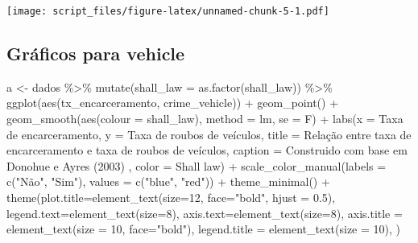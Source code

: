 \documentclass[
]{article}
\newenvironment{Shaded}{\begin{snugshade}}{\end{snugshade}}
\newcommand{\AttributeTok}[1]{\textcolor[rgb]{0.77,0.63,0.00}{#1}}
\newcommand{\DecValTok}[1]{\textcolor[rgb]{0.00,0.00,0.81}{#1}}
\newcommand{\FloatTok}[1]{\textcolor[rgb]{0.00,0.00,0.81}{#1}}
\newcommand{\FunctionTok}[1]{\textcolor[rgb]{0.00,0.00,0.00}{#1}}
\newcommand{\NormalTok}[1]{#1}
\newcommand{\OtherTok}[1]{\textcolor[rgb]{0.56,0.35,0.01}{#1}}
\newcommand{\SpecialCharTok}[1]{\textcolor[rgb]{0.00,0.00,0.00}{#1}}
\newcommand{\StringTok}[1]{\textcolor[rgb]{0.31,0.60,0.02}{#1}}
\begin{document}
\texttt{[image: script\_files/figure-latex/unnamed-chunk-5-1.pdf]}

\hypertarget{gruxe1ficos-para-vehicle}{%
\subsection{Gráficos para vehicle}\label{gruxe1ficos-para-vehicle}}

\begin{Shaded}
\begin{Highlighting}[]
\NormalTok{a }\OtherTok{\textless{}{-}}\NormalTok{ dados }\SpecialCharTok{\%\textgreater{}\%} 
  \FunctionTok{mutate}\NormalTok{(}\AttributeTok{shall\_law =} \FunctionTok{as.factor}\NormalTok{(shall\_law)) }\SpecialCharTok{\%\textgreater{}\%} 
  \FunctionTok{ggplot}\NormalTok{(}\FunctionTok{aes}\NormalTok{(tx\_encarceramento, crime\_vehicle)) }\SpecialCharTok{+}
  \FunctionTok{geom\_point}\NormalTok{() }\SpecialCharTok{+} 
  \FunctionTok{geom\_smooth}\NormalTok{(}\FunctionTok{aes}\NormalTok{(}\AttributeTok{colour =}\NormalTok{ shall\_law), }\AttributeTok{method =} \StringTok{\textquotesingle{}lm\textquotesingle{}}\NormalTok{, }\AttributeTok{se =}\NormalTok{ F) }\SpecialCharTok{+}
  \FunctionTok{labs}\NormalTok{(}\AttributeTok{x =} \StringTok{\textquotesingle{}Taxa de encarceramento\textquotesingle{}}\NormalTok{,}
       \AttributeTok{y =} \StringTok{\textquotesingle{}Taxa de roubos de veículos\textquotesingle{}}\NormalTok{,}
       \AttributeTok{title =} \StringTok{\textquotesingle{}Relação entre taxa de encarceramento e taxa de roubos de veículos\textquotesingle{}}\NormalTok{,}
       \AttributeTok{caption =} \StringTok{\textquotesingle{}Construido com base em Donohue e Ayres (2003)\textquotesingle{}}\NormalTok{ ,}
       \AttributeTok{color =} \StringTok{\textquotesingle{}Shall law\textquotesingle{}}\NormalTok{) }\SpecialCharTok{+} 
  \FunctionTok{scale\_color\_manual}\NormalTok{(}\AttributeTok{labels =} \FunctionTok{c}\NormalTok{(}\StringTok{"Não"}\NormalTok{, }\StringTok{"Sim"}\NormalTok{), }\AttributeTok{values =} \FunctionTok{c}\NormalTok{(}\StringTok{"blue"}\NormalTok{, }\StringTok{"red"}\NormalTok{)) }\SpecialCharTok{+} 
  \FunctionTok{theme\_minimal}\NormalTok{() }\SpecialCharTok{+}
  \FunctionTok{theme}\NormalTok{(}\AttributeTok{plot.title=}\FunctionTok{element\_text}\NormalTok{(}\AttributeTok{size=}\DecValTok{12}\NormalTok{, }\AttributeTok{face=}\StringTok{"bold"}\NormalTok{, }\AttributeTok{hjust =} \FloatTok{0.5}\NormalTok{),}
        \AttributeTok{legend.text=}\FunctionTok{element\_text}\NormalTok{(}\AttributeTok{size=}\DecValTok{8}\NormalTok{),}
        \AttributeTok{axis.text=}\FunctionTok{element\_text}\NormalTok{(}\AttributeTok{size=}\DecValTok{8}\NormalTok{),}
        \AttributeTok{axis.title =} \FunctionTok{element\_text}\NormalTok{(}\AttributeTok{size =} \DecValTok{10}\NormalTok{, }\AttributeTok{face=}\StringTok{"bold"}\NormalTok{),}
        \AttributeTok{legend.title =} \FunctionTok{element\_text}\NormalTok{(}\AttributeTok{size =} \DecValTok{10}\NormalTok{),}
\NormalTok{        )}


\end{Highlighting}
\end{Shaded}
\end{document}
